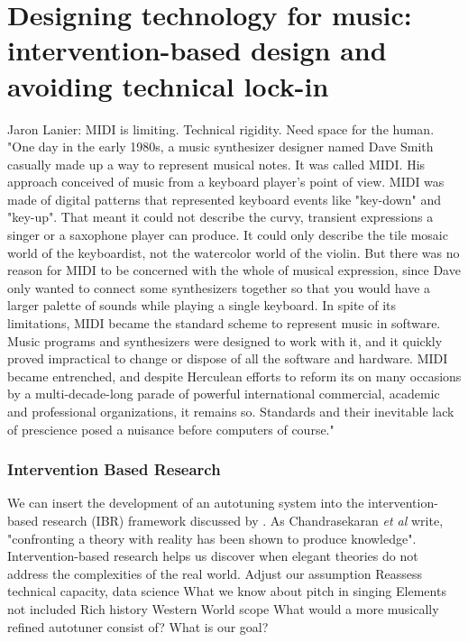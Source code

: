 \chapter{Designing technology for music: intervention-based design and avoiding technical lock-in}
\label{chap:ibr}

Jaron Lanier: MIDI is limiting. Technical rigidity. Need space for the human. "One day in the early 1980s, a music synthesizer designer named Dave Smith casually made up a way to represent musical notes. It was called MIDI. His approach conceived of music from a keyboard player's point of view. MIDI was made of digital patterns that represented keyboard events like "key-down" and "key-up". 
That meant it could not describe the curvy, transient expressions a singer or a saxophone player can produce. It could only describe the tile mosaic world of the keyboardist, not the watercolor world of the violin. But there was no reason for MIDI to be concerned with the whole of musical expression, since Dave only wanted to connect some synthesizers together so that you would have a larger palette of sounds while playing a single keyboard. In spite of its limitations, MIDI became the standard scheme to represent music in software. Music programs and synthesizers were designed to work with it, and it quickly proved impractical to change or dispose of all the software and hardware. MIDI became entrenched, and despite Herculean efforts to reform its on many occasions by a multi-decade-long parade of powerful international commercial, academic and professional organizations, it remains so. Standards and their inevitable lack of prescience posed a nuisance before computers of course."

\subsection{Intervention Based Research}
We can insert the development of an autotuning system into the intervention-based research (IBR) framework discussed by \cite{chandrasekaran2020ibr}. As Chandrasekaran \textit{et al} write, "confronting a theory with reality has been shown to produce knowledge". Intervention-based research helps us discover when elegant theories do not address the complexities of the real world. 
Adjust our assumption
Reassess technical capacity, data science
What we know about pitch in singing
Elements not included
Rich history
Western World scope
What would a more musically refined autotuner consist of?
What is our goal?

